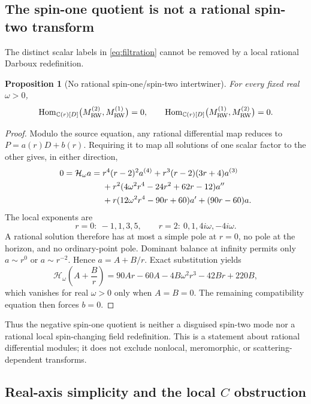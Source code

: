 \documentclass[11pt]{article}
\newtheorem{proposition}[theorem]{Proposition}
\theoremstyle{definition}
\theoremstyle{remark}
\newcommand{\C}{\mathbb C}
\begin{document}
\subsection{The spin-one quotient is not a rational spin-two transform}

The distinct scalar labels in \eqref{eq:filtration} cannot be removed by a
local rational Darboux redefinition.

\begin{proposition}[No rational spin-one/spin-two intertwiner]
\label{prop:no-spin-intertwiner}
For every fixed real \(\omega>0\),
\[
\operatorname{Hom}_{\C(r)[D]}
\bigl(M_{\rm RW}^{(2)},M_{\rm RW}^{(1)}\bigr)=0,
\qquad
\operatorname{Hom}_{\C(r)[D]}
\bigl(M_{\rm RW}^{(1)},M_{\rm RW}^{(2)}\bigr)=0.
\]
\end{proposition}

\begin{proof}
Modulo the source equation, any rational differential map reduces to
\(P=a(r)D+b(r)\).  Requiring it to map all solutions of one scalar factor
to the other gives, in either direction,
\begin{align}
0=\mathcal H_\omega a={}&
r^4(r-2)^2a^{(4)}
+r^3(r-2)(3r+4)a^{(3)}
\notag\\
&+r^2(4\omega^2r^4-24r^2+62r-12)a''
\notag\\
&+r(12\omega^2r^4-90r+60)a'
+(90r-60)a.
\label{eq:spin-intertwiner}
\end{align}
The local exponents are
\[
r=0:\ -1,1,3,5,
\qquad
r=2:\ 0,1,4i\omega,-4i\omega.
\]
A rational solution therefore has at most a simple pole at \(r=0\), no
pole at the horizon, and no ordinary-point pole.  Dominant balance at
infinity permits only \(a\sim r^0\) or \(a\sim r^{-2}\).  Hence
\(a=A+B/r\).  Exact substitution yields
\[
\mathcal H_\omega\!\left(A+\frac Br\right)
=
90Ar-60A-4B\omega^2r^3-42Br+220B,
\]
which vanishes for real \(\omega>0\) only when \(A=B=0\).  The remaining
compatibility equation then forces \(b=0\).
\end{proof}

Thus the negative spin-one quotient is neither a disguised spin-two mode nor
a rational local spin-changing field redefinition.  This is a statement
about rational differential modules; it does not exclude nonlocal,
meromorphic, or scattering-dependent transforms.

\subsection{Real-axis simplicity and the local \(C\) obstruction}
\end{document}
